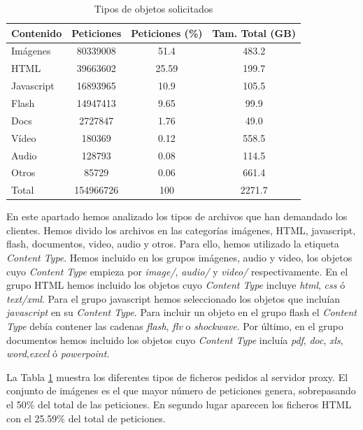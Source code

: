 \documentclass[twocolumn]{Jornadas}
\begin{document}
\begin{table}
\centering
\renewcommand{\baselinestretch}{1.5}
\scriptsize
\begin{tabular}{|l||c|c|c|} \hline
Contenido   & Peticiones & Peticiones (\%) &Tam. Total (GB) \\\hline\hline
Imágenes    & 80339008   & 51.4 &483.2             \\\hline  
HTML        & 39663602   & 25.59 &199.7             \\\hline 
Javascript  & 16893965   & 10.9 &105.5             \\\hline 
Flash       & 14947413   & 9.65 & 99.9              \\\hline 
Docs  & 2727847    & 1.76 &49.0              \\\hline
Vídeo       & 180369     & 0.12 & 558.5             \\\hline 
Audio       & 128793     & 0.08 & 114.5             \\\hline 
Otros       & 85729      & 0.06 & 661.4             \\\hline\hline
Total & 154966726 & 100 & 2271.7 \\\hline
\end{tabular}
\caption{Tipos de objetos solicitados}
\label{table:contenido}
\end{table}

En este apartado hemos analizado los tipos de archivos que han demandado los clientes. Hemos divido los archivos en las categorías imágenes, HTML, javascript, flash, documentos, video, audio y otros. Para ello, hemos utilizado la etiqueta \emph{Content Type}. Hemos incluido en los grupos imágenes, audio y video, los objetos cuyo \emph{Content Type} empieza por \textit{image/}, \textit{audio/} y \textit{video/} respectivamente. En el grupo HTML hemos incluido los objetos cuyo \emph{Content Type} incluye \textit{html}, \textit{css} ó \textit{text/xml}. Para el grupo javascript hemos seleccionado los objetos que incluían \textit{javascript} en su \emph{Content Type}. Para incluir un objeto en el grupo flash el \emph{Content Type} debía contener las cadenas \textit{flash}, \textit{flv} o \textit{shockwave}. Por último, en el grupo documentos hemos incluido los objetos cuyo \emph{Content Type} incluía \textit{pdf}, \textit{doc}, \textit{xls}, \textit{word},\textit{excel} ó \textit{powerpoint}.

La Tabla \ref{table:contenido} muestra los diferentes tipos de ficheros pedidos al servidor proxy. El conjunto de imágenes es el que mayor número de peticiones genera, sobrepasando el 50\% del total de las peticiones. En segundo lugar aparecen los ficheros HTML con el 25.59\% del total de peticiones. 
\end{document}
